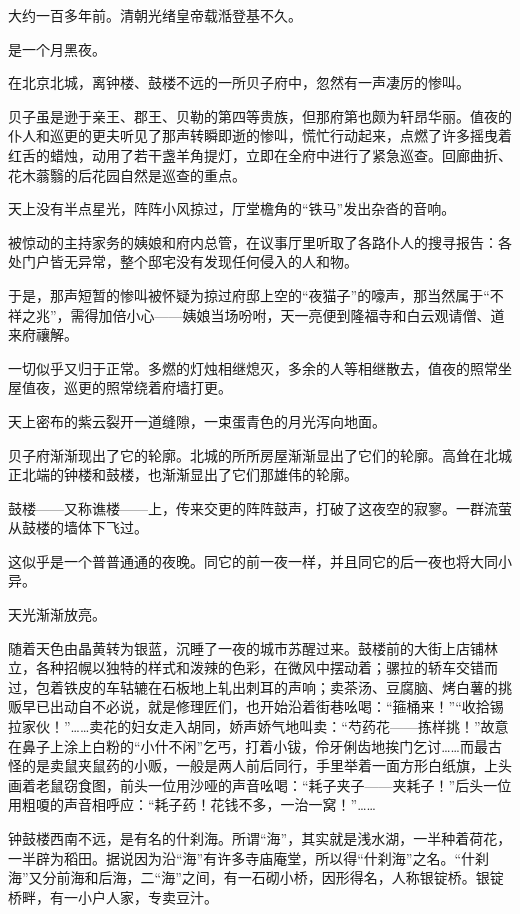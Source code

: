 \par 大约一百多年前。清朝光绪皇帝载湉登基不久。
\par 是一个月黑夜。
\par 在北京北城，离钟楼、鼓楼不远的一所贝子府中，忽然有一声凄厉的惨叫。
\par 贝子虽是逊于亲王、郡王、贝勒的第四等贵族，但那府第也颇为轩昂华丽。值夜的仆人和巡更的更夫听见了那声转瞬即逝的惨叫，慌忙行动起来，点燃了许多摇曳着红舌的蜡烛，动用了若干盏羊角提灯，立即在全府中进行了紧急巡查。回廊曲折、花木蓊翳的后花园自然是巡查的重点。
\par 天上没有半点星光，阵阵小风掠过，厅堂檐角的“铁马”发出杂沓的音响。
\par 被惊动的主持家务的姨娘和府内总管，在议事厅里听取了各路仆人的搜寻报告：各处门户皆无异常，整个邸宅没有发现任何侵入的人和物。
\par 于是，那声短暂的惨叫被怀疑为掠过府邸上空的“夜猫子”的嚎声，那当然属于“不祥之兆”，需得加倍小心——姨娘当场吩咐，天一亮便到隆福寺和白云观请僧、道来府禳解。
\par 一切似乎又归于正常。多燃的灯烛相继熄灭，多余的人等相继散去，值夜的照常坐屋值夜，巡更的照常绕着府墙打更。
\par 天上密布的紫云裂开一道缝隙，一束蛋青色的月光泻向地面。
\par 贝子府渐渐现出了它的轮廓。北城的所所房屋渐渐显出了它们的轮廓。高耸在北城正北端的钟楼和鼓楼，也渐渐显出了它们那雄伟的轮廓。
\par 鼓楼——又称谯楼——上，传来交更的阵阵鼓声，打破了这夜空的寂寥。一群流萤从鼓楼的墙体下飞过。
\par 这似乎是一个普普通通的夜晚。同它的前一夜一样，并且同它的后一夜也将大同小异。
\par 天光渐渐放亮。
\par 随着天色由晶黄转为银蓝，沉睡了一夜的城市苏醒过来。鼓楼前的大街上店铺林立，各种招幌以独特的样式和泼辣的色彩，在微风中摆动着；骡拉的轿车交错而过，包着铁皮的车轱辘在石板地上轧出刺耳的声响；卖茶汤、豆腐脑、烤白薯的挑贩早已出动自不必说，就是修理匠们，也开始沿着街巷吆喝：“箍桶来！”“收拾锡拉家伙！”……卖花的妇女走入胡同，娇声娇气地叫卖：“芍药花——拣样挑！”故意在鼻子上涂上白粉的“小什不闲”乞丐，打着小钹，伶牙俐齿地挨门乞讨……而最古怪的是卖鼠夹鼠药的小贩，一般是两人前后同行，手里举着一面方形白纸旗，上头画着老鼠窃食图，前头一位用沙哑的声音吆喝：“耗子夹子——夹耗子！”后头一位用粗嗄的声音相呼应：“耗子药！花钱不多，一治一窝！”……
\par 钟鼓楼西南不远，是有名的什刹海。所谓“海”，其实就是浅水湖，一半种着荷花，一半辟为稻田。据说因为沿“海”有许多寺庙庵堂，所以得“什刹海”之名。“什刹海”又分前海和后海，二“海”之间，有一石砌小桥，因形得名，人称银锭桥。银锭桥畔，有一小户人家，专卖豆汁。

